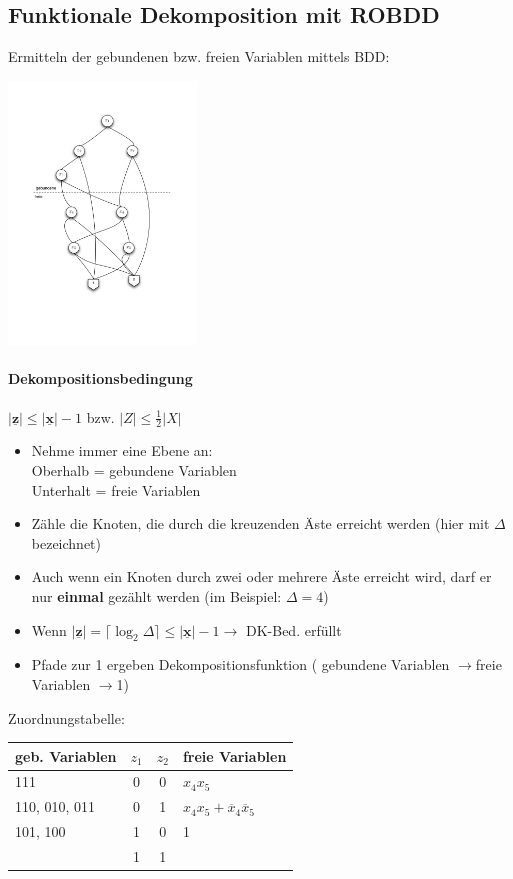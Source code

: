\documentclass[6pt,a4paper]{scrartcl}
\renewcommand{\emph}[1]{\textsf{\textbf{#1}}}
\renewcommand{\vec}[1]{\ensuremath{\underline{\boldsymbol {#1}}}}
\newcommand{\abs}[1]{\ensuremath{\left\vert#1\right\vert}} 							%
\newcommand{\ol}[1]{\ensuremath{\overline{#1}}}									%
\newcommand{\ra}[0]{\ensuremath{\rightarrow}} 									%
\renewcommand{\vec}[1]{\ensuremath{\underline{\boldsymbol {#1}}}}
\begin{document}
\begin{multicols}{3}
\subsection{Funktionale Dekomposition mit ROBDD}
Ermitteln der gebundenen bzw. freien Variablen mittels BDD: \\
\parbox{2.7cm}{ \includegraphics[width = 5cm]{img/eds/fdk.pdf} }
\paragraph{Dekompositionsbedingung} %
$\abs{\vec z} \le \abs{\vec x} - 1$ bzw. $\abs{Z} \le \frac{1}{2} \abs{X}$ \\
\begin{itemize}
	\item Nehme immer eine Ebene an:\\
	Oberhalb = gebundene Variablen \\ 
	Unterhalt = freie Variablen
	\item Zähle die Knoten, die durch die kreuzenden Äste erreicht werden (hier mit $\Delta$ bezeichnet)
	\item Auch wenn ein Knoten durch zwei oder mehrere Äste erreicht wird, darf er nur \emph{einmal} gezählt werden (im Beispiel: $\Delta = 4$)
	\item Wenn $\abs{\vec z} = \lceil \log_2 \Delta \rceil \le \abs{\vec{x}} - 1 \ra$ DK-Bed. erfüllt
	\item Pfade zur 1 ergeben Dekompositionsfunktion ( gebundene Variablen \ra freie Variablen \ra 1)
\end{itemize}
Zuordnungstabelle:\\
\begin{tabular}{l|cc|l}
geb. Variablen & $z_1$ & $z_2$ & freie Variablen \\ \midrule
111 & 0 & 0 & $x_4 x_5$ \\
110, 010, 011 & 0 & 1 & $x_4 x_5 + \ol x_4 \ol x_5$ \\
101, 100 & 1 & 0 & 1 \\
& 1&1& \\
\end{tabular}


\end{multicols}
\end{document}

